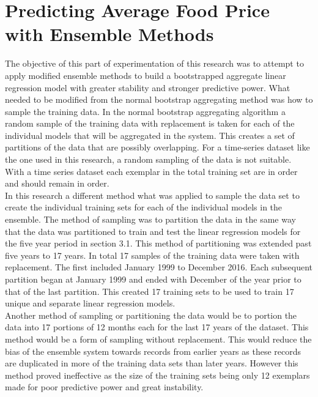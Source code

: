 \documentclass[12pt]{dalthesis}
\begin{document}
\section{Predicting Average Food Price with Ensemble Methods}



The objective of this part of experimentation of this research was to attempt to apply modified ensemble methods to build a bootstrapped aggregate linear regression model with greater stability and stronger predictive power. What needed to be modified from the normal bootstrap aggregating method was how to sample the training data. In the normal bootstrap aggregating algorithm a random sample of the training data with replacement is taken for each of the individual models that will be aggregated in the system. This creates a set of partitions of the data that are possibly overlapping.  For a time-series dataset like the one used in this research, a random sampling of the data is not suitable. With a time series dataset each exemplar in the total training set are in order and should remain in order. \\

In this research a different method what was applied to sample the data set to create the individual training sets for each of the individual models in the ensemble. The method of sampling was to partition the data in the same way that the data was partitioned to train and test the linear regression models for the five year period in section 3.1. This method of partitioning was extended past five years to 17 years. In total 17 samples of the training data were taken with replacement. The first included January 1999 to December 2016. Each subsequent partition began at January 1999 and ended with December of the year prior to that of the last partition. This created 17 training sets to be used to train 17 unique and separate linear regression models. \\

Another method of sampling or partitioning the data would be to portion the data into 17 portions of 12 months each for the last 17 years of the dataset. This method would be a form of sampling without replacement. This would reduce the bias of the ensemble system towards records from earlier years as these records are duplicated in more of the training data sets than later years. However this method proved ineffective as the size of the training sets being only 12 exemplars made for poor predictive power and great instability. \\
\end{document}
